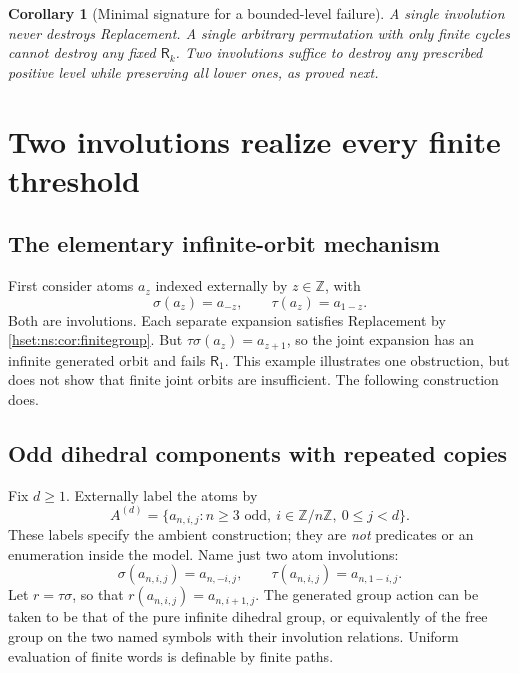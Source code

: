 \documentclass[11pt,letterpaper]{article}
\newtheorem{corollary}[corollary]{Corollary}\aliascntresetthe{corollary}
\theoremstyle{definition}
\theoremstyle{remark}
\begin{document}
\begin{corollary}[Minimal signature for a bounded-level failure]\label{hset:ns:cor:onevs2}
A single involution never destroys Replacement. A single arbitrary permutation with only finite cycles cannot destroy any fixed $\mathsf R_k$. Two involutions suffice to destroy any prescribed positive level while preserving all lower ones, as proved next.
\end{corollary}

\section{Two involutions realize every finite threshold}
\label{hset:ns:sec:strict}

\subsection{The elementary infinite-orbit mechanism}
First consider atoms $a_z$ indexed externally by $z\in\mathbb Z$, with
\[
 \sigma(a_z)=a_{-z},\qquad \tau(a_z)=a_{1-z}.
\]
Both are involutions. Each separate expansion satisfies Replacement by \cref{hset:ns:cor:finitegroup}. But $\tau\sigma(a_z)=a_{z+1}$, so the joint expansion has an infinite generated orbit and fails $\mathsf R_1$. This example illustrates one obstruction, but does not show that finite joint orbits are insufficient. The following construction does.

\subsection{Odd dihedral components with repeated copies}
Fix $d\ge1$. Externally label the atoms by
\begin{equation}\label{hset:ns:eq:Ad}
 A^{(d)}=\{a_{n,i,j}:n\ge3\text{ odd},\ i\in\mathbb Z/n\mathbb Z,\ 0\le j<d\}.
\end{equation}
These labels specify the ambient construction; they are \emph{not} predicates or an enumeration inside the model. Name just two atom involutions:
\begin{equation}\label{hset:ns:eq:involutions}
 \sigma(a_{n,i,j})=a_{n,-i,j},\qquad
 \tau(a_{n,i,j})=a_{n,1-i,j}.
\end{equation}
Let $r=\tau\sigma$, so that $r(a_{n,i,j})=a_{n,i+1,j}$. The generated group action can be taken to be that of the pure infinite dihedral group, or equivalently of the free group on the two named symbols with their involution relations. Uniform evaluation of finite words is definable by finite paths.
\end{document}
